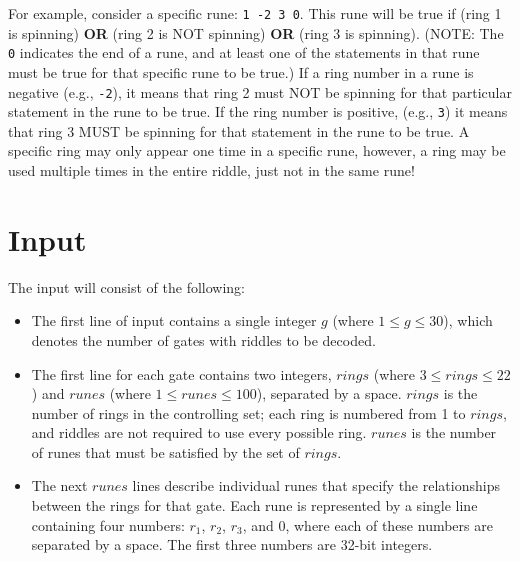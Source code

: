 \documentclass{article}
\begin{document}
For example, consider a specific rune: \verb+1 -2 3 0+.  This rune will be true if (ring 1 is spinning) \textbf{OR} (ring 2 is NOT spinning) \textbf{OR} (ring 3 is spinning).  (NOTE: The \verb+0+ indicates the end of a rune, and at least one of the statements in that rune must be true for that specific rune to be true.) If a ring number in a rune is negative (e.g., \verb+-2+), it means that ring 2 must NOT be spinning for that particular statement in the rune to be true.  If the ring number is positive, (e.g., \verb+3+) it means that ring 3 MUST be spinning for that statement in the rune to be true.  A specific ring may only appear one time in a specific rune, however, a ring may be used multiple times in the entire riddle, just not in the same rune!

\section{Input}

The input will consist of the following:
\begin{itemize}

\item The first line of input contains a single integer $g$ (where $1 \le g \le
30$), which denotes the number of gates with riddles to be decoded.

\item The first line for each gate contains two integers, $rings$ (where $3 \le
rings \le 22$) and $runes$ (where $1 \le runes \le 100$), separated by a space.
$rings$ is the number of rings in the controlling set; each ring is numbered
from 1 to $rings$, and riddles are not required to use every possible ring.
$runes$ is the number of runes that must be satisfied by the set of $rings$.

\item The next $runes$ lines describe individual runes that specify the
relationships between the rings for that gate. Each rune is represented by a
single line containing four numbers: $r_1$, $r_2$, $r_3$, and $0$, where each 
of these numbers are separated by a space.  The first three numbers are 
32-bit integers.

\end{itemize}

%
\end{document}
